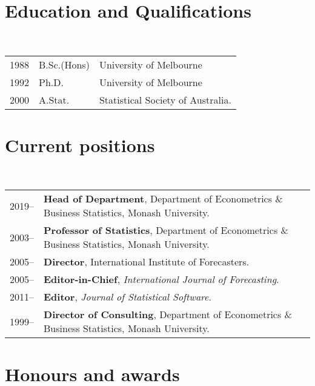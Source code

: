 \documentclass[a4paper,10pt]{article}
\begin{document}
\maketitle

\section{Education and Qualifications}

~\begin{tabular}{lll}
1988 & B.Sc.(Hons) & University of Melbourne\\
1992 & Ph.D. & University of Melbourne\\
2000 & A.Stat. & Statistical Society of Australia.
\end{tabular}


\section{Current positions}

~\begin{tabular}{lP{15cm}}
2019--& \textbf{Head of Department},
        Department of Econometrics \& Business Statistics, Monash University.\\
2003--& \textbf{Professor of Statistics},
        Department of Econometrics \& Business Statistics, Monash University.\\
2005--& \textbf{Director},
        International Institute of Forecasters.\\
2005--& \textbf{Editor-in-Chief},
        \textit{International Journal of Forecasting}.\\
2011--& \textbf{Editor}, \textit{Journal of Statistical Software}.\\
1999--& \textbf{Director of Consulting},
        Department of Econometrics \& Business Statistics, Monash University.
\end{tabular}



\section{Honours and awards}
\end{document}
